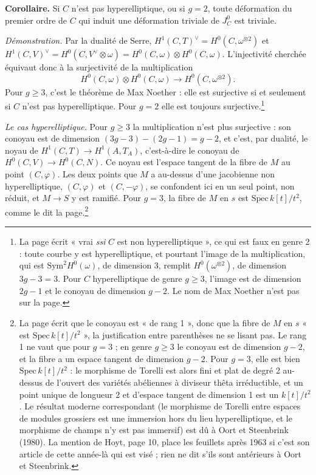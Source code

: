 \documentclass[11pt,a4paper]{article}
\begin{document}
\textbf{Corollaire.} Si $C$ n'est pas hyperelliptique, ou si $g = 2$, toute
déformation du premier ordre de $C$ qui induit une déformation triviale de
$J^{0}_{C}$ est triviale.

\emph{Démonstration.} Par la dualité de Serre, $H^{1}(C, T)^{\vee} =
H^{0}(C, \omega^{\otimes 2})$ et $H^{1}(C, V)^{\vee} = H^{0}(C, V^{\vee}
\otimes \omega) = H^{0}(C, \omega) \otimes H^{0}(C, \omega)$. L'injectivité
cherchée équivaut donc à la surjectivité de la multiplication
\[
  H^{0}(C, \omega) \otimes H^{0}(C, \omega) \longrightarrow
  H^{0}(C, \omega^{\otimes 2}).
\]
Pour $g \geq 3$, c'est le théorème de Max Noether : elle est surjective si et
seulement si $C$ n'est pas hyperelliptique. Pour $g = 2$ elle est toujours
surjective.\footnote{La page écrit « vrai \emph{ssi} $C$ est non
hyperelliptique », ce qui est faux en genre 2 : toute courbe y est
hyperelliptique, et pourtant l'image de la multiplication, qui est
$\mathrm{Sym}^{2} H^{0}(\omega)$, de dimension 3, remplit
$H^{0}(\omega^{\otimes 2})$, de dimension $3g - 3 = 3$. Pour $C$
hyperelliptique de genre $g \geq 3$, l'image est de dimension $2g - 1$ et le
conoyau de dimension $g - 2$. Le nom de Max Noether n'est pas sur la page.}

\emph{Le cas hyperelliptique.} Pour $g \geq 3$ la multiplication n'est plus
surjective : son conoyau est de dimension $(3g-3) - (2g-1) = g - 2$, et c'est,
par dualité, le noyau de $H^{1}(C, T) \to H^{1}(A, T_{A})$, c'est-à-dire le
conoyau de $H^{0}(C, V) \to H^{0}(C, N)$. Ce noyau est l'espace tangent de la
fibre de $M$ au point $(C, \varphi)$. Les deux points que $M$ a au-dessus d'une
jacobienne non hyperelliptique, $(C, \varphi)$ et $(C, -\varphi)$, se
confondent ici en un seul point, non réduit, et $M \to S$ y est ramifié. Pour
$g = 3$, la fibre de $M$ en $s$ est $\mathrm{Spec}\, k[t]/t^{2}$, comme le dit
la page.\footnote{La page écrit que le conoyau est « de rang 1 », donc que la
fibre de $M$ en $s$ « est $\mathrm{Spec}\, k[t]/t^{2}$ », la justification
entre parenthèses ne se lisant pas. Le rang 1 ne vaut que pour $g = 3$ ; en
genre $g \geq 3$ le conoyau est de dimension $g - 2$, et la fibre a un espace
tangent de dimension $g - 2$. Pour $g = 3$, elle est bien
$\mathrm{Spec}\, k[t]/t^{2}$ : le morphisme de Torelli est alors fini et plat
de degré 2 au-dessus de l'ouvert des variétés abéliennes à diviseur thêta
irréductible, et un point unique de longueur 2 et d'espace tangent de
dimension 1 est un $k[t]/t^{2}$. Le résultat moderne correspondant (le
morphisme de Torelli entre espaces de modules grossiers est une immersion hors
du lieu hyperelliptique, et le morphisme de champs n'y est pas immersif)
est dû à Oort et Steenbrink (1980). La mention de Hoyt, page 10, place les
feuillets après 1963 si c'est son article de cette année-là qui est visé ;
rien ne dit s'ils sont antérieurs à Oort et Steenbrink.}
\end{document}
